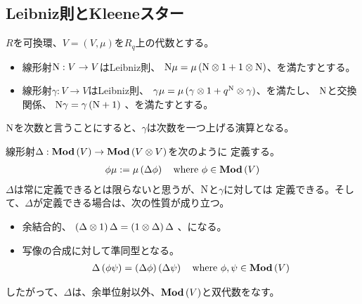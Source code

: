 {\subsection{Leibniz則とKleeneスター}\label{s2:Leibniz則とKleeneスター} %
	$R$を可換環、$V=(V,\mu)$を$R_q$上の代数とする。
	\begin{itemize}\setlength{\itemsep}{-1mm} %
		\item 線形射${\mathinner{\operatorname{N}}}:V\to V$はLeibniz則、
		${\mathinner{\operatorname{N}}}\mu = \mu\mathinner{({{\mathinner{\operatorname{N}}}\otimes1 + 1\otimes{\mathinner{\operatorname{N}}}})}$、を満たすとする。
		\item 線形射$\gamma:V\to V$はLeibniz則、
		$\gamma\mu = \mu\mathinner{({\gamma\otimes1 + q^{\mathinner{\operatorname{N}}}\otimes\gamma})}$、を満たし、
		${\mathinner{\operatorname{N}}}$と交換関係、
		${\mathinner{\operatorname{N}}}\gamma = \gamma\mathinner{({{\mathinner{\operatorname{N}}}+ 1})}$
		、を満たすとする。
	\end{itemize} %
	${\mathinner{\operatorname{N}}}$を次数と言うことにすると、$\gamma$は次数を一つ上げる演算となる。

	線形射$\Delta:{\mathbf{Mod}}\mathinner{({V})}\to{\mathbf{Mod}}\mathinner{({V\otimes V})}$を次のように
	定義する。
	\begin{equation*}\begin{split}
		\phi\mu := \mu\mathinner{({\Delta\phi})} \quad\text{where }\phi\in{\mathbf{Mod}}\mathinner{({V})}
	\end{split}\end{equation*}
	$\Delta$は常に定義できるとは限らないと思うが、${\mathinner{\operatorname{N}}}$と$\gamma$に対しては
	定義できる。そして、$\Delta$が定義できる場合は、次の性質が成り立つ。
	\begin{itemize}\setlength{\itemsep}{-1mm} %
		\item 余結合的、
		$\mathinner{({\Delta\otimes1})}\Delta = \mathinner{({1\otimes\Delta})}\Delta$ 、になる。
		\item 写像の合成に対して準同型となる。
		\begin{equation*}\begin{split}
			\Delta\mathinner{({\phi\psi})} = \mathinner{({\Delta\phi})}\mathinner{({\Delta\psi})}
			\quad\text{where }\phi,\psi\in{\mathbf{Mod}}\mathinner{({V})}
		\end{split}\end{equation*}
	\end{itemize} %
	したがって、$\Delta$は、余単位射以外、${\mathbf{Mod}}\mathinner{({V})}$と双代数をなす。

}
